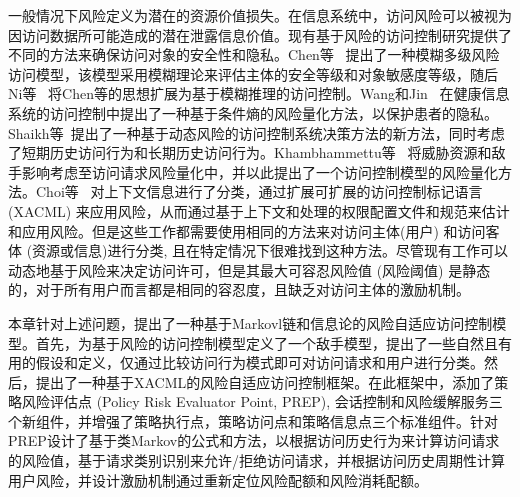 一般情况下风险定义为潜在的资源价值损失。在信息系统中，访问风险可以被视为因访问数据所可能造成的潜在泄露信息价值。现有基于风险的访问控制研究提供了不同的方法来确保访问对象的安全性和隐私。Chen等~\cite{cheng2007fuzzy} 提出了一种模糊多级风险访问模型，该模型采用模糊理论来评估主体的安全等级和对象敏感度等级，随后Ni等~\cite{ni2010risk} 将Chen等的思想扩展为基于模糊推理的访问控制。Wang和Jin~\cite{wang2011quantified} 在健康信息系统的访问控制中提出了一种基于条件熵的风险量化方法，以保护患者的隐私。Shaikh等~\cite{shaikh2012dynamic}提出了一种基于动态风险的访问控制系统决策方法的新方法，同时考虑了短期历史访问行为和长期历史访问行为。Khambhammettu等~\cite{khambhammettu2013framework} 将威胁资源和敌手影响考虑至访问请求风险量化中，并以此提出了一个访问控制模型的风险量化方法。Choi等~\cite{choi2015framework} 对上下文信息进行了分类，通过扩展可扩展的访问控制标记语言 (XACML) 来应用风险，从而通过基于上下文和处理的权限配置文件和规范来估计和应用风险。但是这些工作都需要使用相同的方法来对访问主体(用户) 和访问客体 (资源或信息)进行分类, 且在特定情况下很难找到这种方法。尽管现有工作可以动态地基于风险来决定访问许可，但是其最大可容忍风险值 (风险阈值) 是静态的，对于所有用户而言都是相同的容忍度，且缺乏对访问主体的激励机制。

本章针对上述问题，提出了一种基于Markovl链和信息论的风险自适应访问控制模型。首先，为基于风险的访问控制模型定义了一个敌手模型，提出了一些自然且有用的假设和定义，仅通过比较访问行为模式即可对访问请求和用户进行分类。然后，提出了一种基于XACML的风险自适应访问控制框架。在此框架中，添加了策略风险评估点 (Policy Risk Evaluator Point, PREP), 会话控制和风险缓解服务三个新组件，并增强了策略执行点，策略访问点和策略信息点三个标准组件。针对PREP设计了基于类Markov的公式和方法，以根据访问历史行为来计算访问请求的风险值，基于请求类别识别来允许/拒绝访问请求，并根据访问历史周期性计算用户风险，并设计激励机制通过重新定位风险配额和风险消耗配额。

